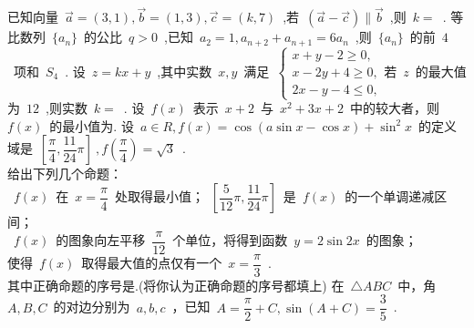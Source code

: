 \documentclass[printbox]{BHCexam}
\begin{document}
\begin{questions}
\clearpage
\begin{figure}[!htb] 
\begin{minipage}[t]{0.5\textwidth}%
\vspace{-1cm}
\centering  
\end{minipage}  
\begin{minipage}[t]{0.5\textwidth}  
\vspace{0cm}
\centering  
\end{minipage}  
\end{figure}
\vspace{-2cm}
\tiankong
\question 已知向量~$\vec{a}=(3,1),\vec{b}=(1,3),\vec{c}=(k,7)$~,若~$(\vec{a}-\vec{c}) \parallel \vec{b}$~,则~$k=$~\mtk{}.
\question 等比数列~$\{a_n \}$~的公比~$q>0$~,已知~$a_2=1,a_{n+2}+a_{n+1}=6a_n$~,则~$\{a_n \}$~的前~$4$~项和~$S_4$~\mtk{}.
\question 设~$z=kx+y$~,其中实数~$x,y$~满足~$ \begin{cases}
x+y-2\geq 0,\\
x-2y+4\geq 0, \\
2x-y-4\leq 0,
\end{cases}$若~$z$~的最大值为~$12$~,则实数~$k=$~\mtk{}.
\question 设~$f(x)$~表示~$x+2$~与~$x^2+3x+2$~中的较大者，则~$f(x)$~的最小值为\mtk{}.
\question 设~$a\in R,f(x)=\cos (a\sin x-\cos x)+\sin ^2 x$~的定义域是~$\left[ \dfrac{\pi}{4},\dfrac{11}{24} \pi \right]~,f(\dfrac{\pi}{4})=\sqrt{3}$~.\\给出下列几个命题：\\
~$f(x)$~在~$x=\dfrac{\pi}{4}$~处取得最小值；~$\left[ \dfrac{5}{12} \pi,\dfrac{11}{24} \pi \right]$~是~$f(x)$~的一个单调递减区间；\\
~$f(x)$~的图象向左平移~$\dfrac{\pi}{12}$~个单位，将得到函数~$y=2\sin {2x}$~的图象；\\
使得~$f(x)$~取得最大值的点仅有一个~$x=\dfrac{\pi}{3}$~.\\
其中正确命题的序号是\mtk{}.(将你认为正确命题的序号都填上)
\jianda
\question 在~$\triangle ABC$~中，角~$A,B,C$~的对边分别为~$a,b,c$~，已知~$A=\dfrac{\pi}{2}+C,\sin (A+C)=\dfrac{3}{5}$~.
\end{questions}
\end{document}
